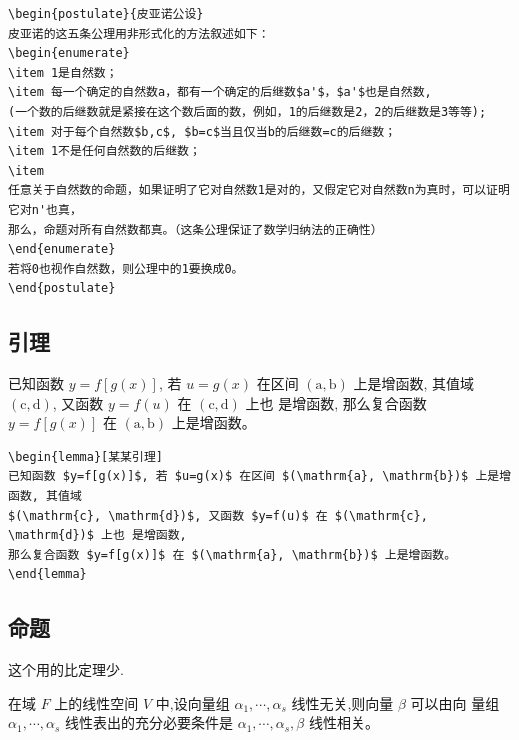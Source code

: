 \documentclass[../book.tex]{subfiles}
\begin{document}
\begin{lstlisting}
\begin{postulate}{皮亚诺公设}
皮亚诺的这五条公理用非形式化的方法叙述如下：
\begin{enumerate}
\item 1是自然数；
\item 每一个确定的自然数a，都有一个确定的后继数$a'$，$a'$也是自然数,
(一个数的后继数就是紧接在这个数后面的数，例如，1的后继数是2，2的后继数是3等等);
\item 对于每个自然数$b,c$, $b=c$当且仅当b的后继数=c的后继数；
\item 1不是任何自然数的后继数；
\item
任意关于自然数的命题，如果证明了它对自然数1是对的，又假定它对自然数n为真时，可以证明它对n'也真，
那么，命题对所有自然数都真。（这条公理保证了数学归纳法的正确性）
\end{enumerate}
若将0也视作自然数，则公理中的1要换成0。
\end{postulate}
\end{lstlisting}

    \subsection{引理}

\begin{lemma}[某某引理]
已知函数 $y=f[g(x)]$, 若 $u=g(x)$ 在区间 $(\mathrm{a}, \mathrm{b})$ 上是增函数, 其值域
$(\mathrm{c}, \mathrm{d})$, 又函数 $y=f(u)$ 在 $(\mathrm{c}, \mathrm{d})$ 上也 是增函数,
那么复合函数 $y=f[g(x)]$ 在 $(\mathrm{a}, \mathrm{b})$ 上是增函数。
\end{lemma}

\begin{lstlisting}
\begin{lemma}[某某引理]
已知函数 $y=f[g(x)]$, 若 $u=g(x)$ 在区间 $(\mathrm{a}, \mathrm{b})$ 上是增函数, 其值域
$(\mathrm{c}, \mathrm{d})$, 又函数 $y=f(u)$ 在 $(\mathrm{c}, \mathrm{d})$ 上也 是增函数,
那么复合函数 $y=f[g(x)]$ 在 $(\mathrm{a}, \mathrm{b})$ 上是增函数。
\end{lemma}
\end{lstlisting}

    \subsection{命题}

这个用的比定理少.

\begin{proposition}
在域 $F$ 上的线性空间 $V$ 中,设向量组 $\alpha_{1}, \cdots, \alpha_{s}$ 线性无关,则向量
$\beta$ 可以由向 量组 $\alpha_{1}, \cdots, \alpha_{s}$ 线性表出的充分必要条件是 $\alpha_{1},
\cdots, \alpha_{s}, \beta$ 线性相关。
\end{proposition}
\end{document}

